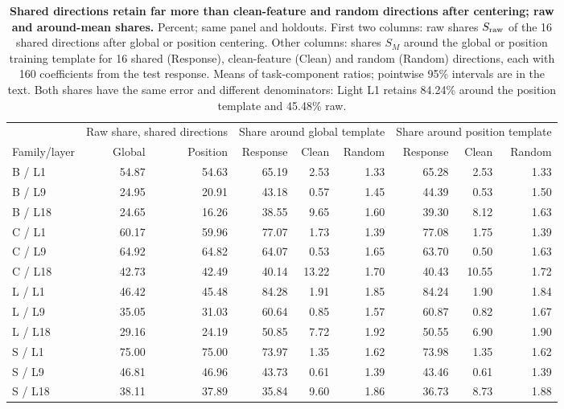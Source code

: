 \begin{table}[t]
\caption{\textbf{Shared directions retain far more than clean-feature and random directions after centering; raw and around-mean shares.} Percent; same panel and holdouts. First two columns: raw shares $S_{\rm raw}$ of the 16 shared directions after global or position centering. Other columns: shares $S_M$ around the global or position training template for 16 shared (Response), clean-feature (Clean) and random (Random) directions, each with 160 coefficients from the test response. Means of task-component ratios; pointwise 95\% intervals are in the text. Both shares have the same error and different denominators: Light L1 retains 84.24\% around the position template and 45.48\% raw.}

\centering\small
\setlength{\tabcolsep}{5pt}
\begin{tabular}{lrrrrrrrr}
\toprule
 & \multicolumn{2}{c}{Raw share, shared directions} & \multicolumn{3}{c}{Share around global template} & \multicolumn{3}{c}{Share around position template}\\
Family/layer & Global & Position & Response & Clean & Random & Response & Clean & Random\\
\midrule
B / L1 & 54.87 & 54.63 & 65.19 & 2.53 & 1.33 & 65.28 & 2.53 & 1.33\\
B / L9 & 24.95 & 20.91 & 43.18 & 0.57 & 1.45 & 44.39 & 0.53 & 1.50\\
B / L18 & 24.65 & 16.26 & 38.55 & 9.65 & 1.60 & 39.30 & 8.12 & 1.63\\
C / L1 & 60.17 & 59.96 & 77.07 & 1.73 & 1.39 & 77.08 & 1.75 & 1.39\\
C / L9 & 64.92 & 64.82 & 64.07 & 0.53 & 1.65 & 63.70 & 0.50 & 1.63\\
C / L18 & 42.73 & 42.49 & 40.14 & 13.22 & 1.70 & 40.43 & 10.55 & 1.72\\
L / L1 & 46.42 & 45.48 & 84.28 & 1.91 & 1.85 & 84.24 & 1.90 & 1.84\\
L / L9 & 35.05 & 31.03 & 60.64 & 0.85 & 1.57 & 60.87 & 0.82 & 1.67\\
L / L18 & 29.16 & 24.19 & 50.85 & 7.72 & 1.92 & 50.55 & 6.90 & 1.90\\
S / L1 & 75.00 & 75.00 & 73.97 & 1.35 & 1.62 & 73.98 & 1.35 & 1.62\\
S / L9 & 46.81 & 46.96 & 43.73 & 0.61 & 1.39 & 43.46 & 0.61 & 1.39\\
S / L18 & 38.11 & 37.89 & 35.84 & 9.60 & 1.86 & 36.73 & 8.73 & 1.88\\
\bottomrule
\end{tabular}

\label{tab:mean-centered-controls}
\end{table}


